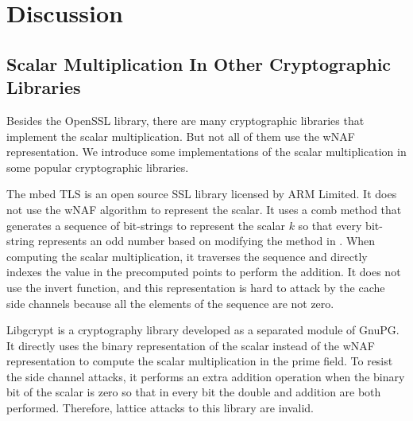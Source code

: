 \section{Discussion}
\label{sec:discussion}

\subsection{Scalar Multiplication In Other Cryptographic Libraries}
Besides the OpenSSL library, there are many cryptographic libraries that implement the scalar multiplication.
But not all of them use the wNAF representation.
We introduce some implementations of the scalar multiplication in some popular cryptographic libraries.

The mbed TLS \cite{polarssl} is an open source SSL library licensed by ARM Limited.
It does not use the wNAF algorithm to represent the scalar.
It uses a comb method that generates a sequence of bit-strings to represent the scalar $k$ so that every bit-string represents an odd number based on modifying the method in \cite{Hedabou2004ACM}.
When computing the scalar multiplication, it traverses the sequence and directly indexes the value in the precomputed points to perform the addition.
It does not use the invert function,
and this representation is hard to attack by the cache side channels because all the elements of the sequence are not zero.

Libgcrypt \cite{libgcrypt} is a cryptography library developed as a separated module of GnuPG.
It directly uses the binary representation of the scalar instead of the wNAF representation to compute the scalar multiplication in the prime field.
To resist the side channel attacks, it performs an extra addition operation when the binary bit of the scalar is zero so that in every bit the double and addition are both performed.
Therefore, lattice attacks to this library are invalid.






